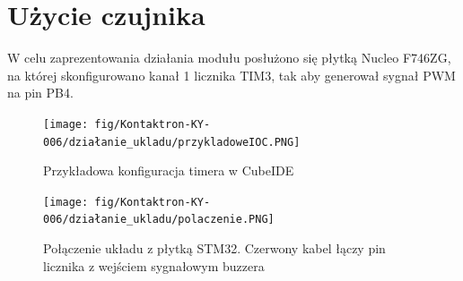 \documentclass[11pt, a4paper]{article}
\begin{document}
\newpage
{}
\section{Użycie czujnika}
W celu zaprezentowania działania modułu posłużono się płytką Nucleo F746ZG, na której skonfigurowano kanał 1 licznika TIM3, tak aby generował sygnał PWM na pin PB4. 

\vspace{0.3cm}
\begin{figure}[H]
\centering
\texttt{[image: fig/Kontaktron-KY-006/działanie\_ukladu/przykladoweIOC.PNG]}
\caption{Przykładowa konfiguracja timera w CubeIDE}
\label{fig:sub3}
\end{figure}
\vspace{0.3cm}
\vspace{0.3cm}
\begin{figure}[H]
\centering
\texttt{[image: fig/Kontaktron-KY-006/działanie\_ukladu/polaczenie.PNG]}
\caption{Połączenie układu z płytką STM32. Czerwony kabel łączy pin licznika z wejściem sygnałowym buzzera}
\label{fig:sub3}
\end{figure}
\vspace{0.3cm}

\printbibliography[heading=bibintoc]
\end{document}
